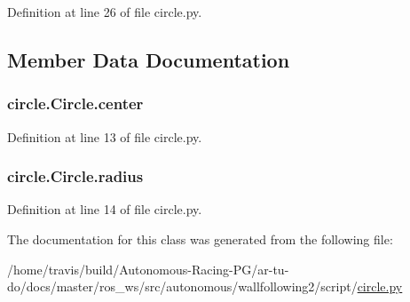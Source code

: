 Definition at line 26 of file circle.\+py.



\subsection{Member Data Documentation}
\subsubsection[{\texorpdfstring{center}{center}}]{\setlength{\rightskip}{0pt plus 5cm}circle.\+Circle.\+center}\hypertarget{classcircle_1_1_circle_aa2ed466736c7e4436ab6ded456ebd24b}{}\label{classcircle_1_1_circle_aa2ed466736c7e4436ab6ded456ebd24b}


Definition at line 13 of file circle.\+py.

\subsubsection[{\texorpdfstring{radius}{radius}}]{\setlength{\rightskip}{0pt plus 5cm}circle.\+Circle.\+radius}\hypertarget{classcircle_1_1_circle_a33aec6cd768f0a1850fae92cf3fcbc95}{}\label{classcircle_1_1_circle_a33aec6cd768f0a1850fae92cf3fcbc95}


Definition at line 14 of file circle.\+py.



The documentation for this class was generated from the following file\+:\begin{DoxyCompactItemize}
\item 
/home/travis/build/\+Autonomous-\/\+Racing-\/\+P\+G/ar-\/tu-\/do/docs/master/ros\+\_\+ws/src/autonomous/wallfollowing2/script/\hyperlink{circle_8py}{circle.\+py}\end{DoxyCompactItemize}
